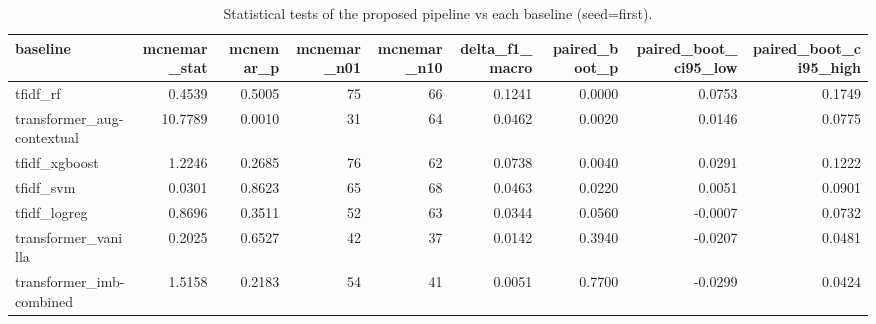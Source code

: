 \begin{table}
\caption{Statistical tests of the proposed pipeline vs each baseline (seed=first).}
\label{tab:sig_vs_proposed}
\begin{tabular}{lrrrrrrrr}
\toprule
baseline & mcnemar\_stat & mcnemar\_p & mcnemar\_n01 & mcnemar\_n10 & delta\_f1\_macro & paired\_boot\_p & paired\_boot\_ci95\_low & paired\_boot\_ci95\_high \\
\midrule
tfidf\_rf & 0.4539 & 0.5005 & 75 & 66 & 0.1241 & 0.0000 & 0.0753 & 0.1749 \\
transformer\_aug-contextual & 10.7789 & 0.0010 & 31 & 64 & 0.0462 & 0.0020 & 0.0146 & 0.0775 \\
tfidf\_xgboost & 1.2246 & 0.2685 & 76 & 62 & 0.0738 & 0.0040 & 0.0291 & 0.1222 \\
tfidf\_svm & 0.0301 & 0.8623 & 65 & 68 & 0.0463 & 0.0220 & 0.0051 & 0.0901 \\
tfidf\_logreg & 0.8696 & 0.3511 & 52 & 63 & 0.0344 & 0.0560 & -0.0007 & 0.0732 \\
transformer\_vanilla & 0.2025 & 0.6527 & 42 & 37 & 0.0142 & 0.3940 & -0.0207 & 0.0481 \\
transformer\_imb-combined & 1.5158 & 0.2183 & 54 & 41 & 0.0051 & 0.7700 & -0.0299 & 0.0424 \\
\bottomrule
\end{tabular}
\end{table}
